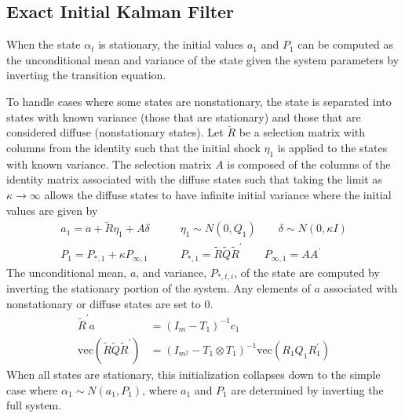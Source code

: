 \documentclass[12pt]{article}
\newcommand{\vecop}[0]{\text{vec}}
\begin{document}
\subsection*{Exact Initial Kalman Filter}
	When the state $\alpha_t$ is stationary, the initial values $a_1$ and $P_1$ can be computed as the unconditional mean and variance of the state given the system parameters by inverting the transition equation. 

	To handle cases where some states are nonstationary, the state is separated into states with known variance (those that are stationary) and those that are considered diffuse (nonstationary states). Let $\tilde{R}$ be a selection matrix with columns from the identity such that the initial shock $\eta_1$ is applied to the states with known variance. The selection matrix $A$ is composed of the columns of the identity matrix associated with the diffuse states such that taking the limit as $\kappa \rightarrow \infty$ allows the diffuse states to have infinite initial variance where the initial values are given by 
	\begin{align*}
	a_1 = a + \tilde{R} \eta_1 + A \delta \qquad& \eta_1 \sim N(0, Q_1) \qquad \delta \sim N(0, \kappa I) \\
	P_1 = P_{*,1} + \kappa P_{\infty,1} \qquad& P_{*,1} = \tilde{R} \tilde{Q} \tilde{R}^\prime \qquad P_{\infty,1} = A A^\prime 
	\end{align*}
	The unconditional mean, $a$, and variance, $P_{*,t,i}$, of the state are computed by inverting the stationary portion of the system. Any elements of $a$ associated with nonstationary or diffuse states are set to 0.
	\begin{align*}
	\tilde{R}^\prime a &= (I_m - T_1)^{-1} c_1 \\
	\vecop(\tilde{R} \tilde{Q} \tilde{R}^\prime) &= (I_{m^2} - T_1 \otimes T_1)^{-1} \vecop(R_1 Q_1 R_1^\prime) 
	\end{align*}
	When all states are stationary, this initialization collapses down to the simple case where $\alpha_1 \sim N(a_1, P_1)$, where $a_1$ and $P_1$ are determined by inverting the full system. 
\end{document}
